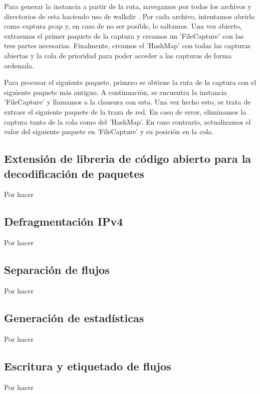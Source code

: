 Para generar la instancia a partir de la ruta, navegamos por todos los archivos y directorios de esta haciendo uso de walkdir \cite{walkdir}. Por cada archivo, intentamos abrirlo como captura pcap y, en caso de no ser posible, lo saltamos. Una vez abierto, extraemos el primer paquete de la captura y creamos un 'FileCapture' con las tres partes necesarias. Finalmente, creamos el 'HashMap' con todas las capturas abiertas y la cola de prioridad para poder acceder a las capturas de forma ordenada.

Para procesar el siguiente paquete, primero se obtiene la ruta de la captura con el siguiente paquete más antiguo. A continuación, se encuentra la instancia 'FileCapture' y llamamos a la clausura con esta. Una vez hecho esto, se trata de extraer el siguiente paquete de la traza de red. En caso de error, eliminamos la captura tanto de la cola como del 'HashMap'. En caso contrario, actualizamos el valor del siguiente paquete en 'FileCapture' y su posición en la cola.

\subsection{Extensión de libreria de código abierto para la decodificación de paquetes}

Por hacer

\subsection{Defragmentación IPv4}

Por hacer

\subsection{Separación de flujos}

Por hacer

\subsection{Generación de estadísticas}

Por hacer

\subsection{Escritura y etiquetado de flujos}

Por hacer

